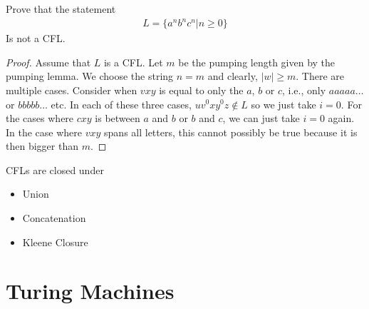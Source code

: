 \documentclass[a4paper]{article}
\theoremstyle{plain}
\theoremstyle{definition}
\newtheorem{defn}{Definition}[section]
\newtheorem{exmp}{Example}[section]
\theoremstyle{remark}
\begin{document}
\begin{tcolorbox}[colback=black!3!white,colframe=black!60!white,title=\begin{exmp}CFL Pumping Example \label{CFL Pumping Example}\end{exmp}]
        Prove that the statement
                \begin{align}
                L = \{a^{n}b^{n}c^{n} | n\ge 0 \}
                \end{align}
	Is not a CFL.
	\begin{proof}
		Assume that $L$ is a CFL. Let $m$ be the pumping length given by the pumping lemma. We choose the string $n=m$ and clearly, $|w| \ge m$.
		There are multiple cases. Consider when $vxy$ is equal to only the $a$, $b$ or $c$, i.e., only $aaaaa\ldots$ or $bbbbb\ldots$ etc. In each of these three cases, $uv^{0}xy^{0}z \not\in L$ so we just take $i=0$. For the cases where  $cxy$ is between $a$ and $b$ or $b$ and $c$, we can just take $i=0$ again. In the case where $vxy$ spans all letters, this cannot possibly be true because it is then bigger than $m$. 
	\end{proof}
\end{tcolorbox}
\begin{tcolorbox}[colback=black!3!white,colframe=black!60!white,title=\begin{defn}Properties \label{Properties}\end{defn}]
CFLs are closed under
\begin{itemize}
	\item Union
	\item Concatenation
	\item Kleene Closure
\end{itemize}
\end{tcolorbox}
\section{Turing Machines}
\end{document}
